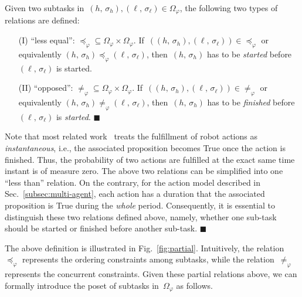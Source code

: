 \begin{definition}\label{def:partial}
Given two subtasks in~$(h,\,\sigma_h),
(\ell,\,\sigma_\ell)\in \Omega_{\varphi}$,
the following two types of relations are defined:
\begin{itemize}
\item[(I)] ``less equal'': $\preceq_{\varphi}\subseteq \Omega_{\varphi} \times \Omega_{\varphi}$.
If~$\left((h,\,\sigma_h), (\ell,\,\sigma_\ell)\right)\in \preceq_{\varphi}$ or
equivalently $(h,\,\sigma_h)\preceq_{\varphi}(\ell,\,\sigma_\ell)$,
then~$(h,\,\sigma_h)$ has to be \emph{started} before $(\ell,\,\sigma_\ell)$ is started.
\item[(II)] ``opposed'': $\neq_{\varphi}\subseteq \Omega_{\varphi} \times \Omega_{\varphi}$.
If~$\left((h,\,\sigma_h), (\ell,\,\sigma_\ell)\right)\in \neq_{\varphi}$
or equivalently $(h,\,\sigma_h)\neq_{\varphi}(\ell,\,\sigma_\ell)$,
then~$(h,\,\sigma_h)$ has to be \emph{finished} {before} $(\ell,\,\sigma_\ell)$ is \emph{started}.
\hfill $\blacksquare$
\end{itemize}
\end{definition}


\begin{remark}\label{remark:duration}
Note that most related work~\cite{kantaros2020stylus, guo2015multi,
tumova2016multi, luo2021abstraction, sahin2019multirobot, jones2019scratchs}
treats the fulfillment of robot actions as \emph{instantaneous},
i.e., the associated proposition becomes True once the action is finished.
Thus, the probability of two actions are fulfilled at the exact same time instant is of measure zero.
The above two relations can be simplified into one ``less than'' relation.
On the contrary, for the action model described in Sec.~\ref{subsec:multi-agent},
each action has a duration that the associated proposition is True during the \emph{whole} period.
Consequently, it is essential to distinguish these two relations defined above,
namely, whether one sub-task should be started or finished before another sub-task.
\hfill  $\blacksquare$
\end{remark}


The above definition is illustrated in Fig.~\ref{fig:partial}.
Intuitively, the relation~$\preceq_{\varphi}$ represents the ordering
constraints among subtasks,
while the relation~$\neq_{\varphi}$ represents the concurrent constraints.
Given these partial relations above, we can formally introduce the poset of subtasks in~$\Omega_{\varphi}$ as follows.


